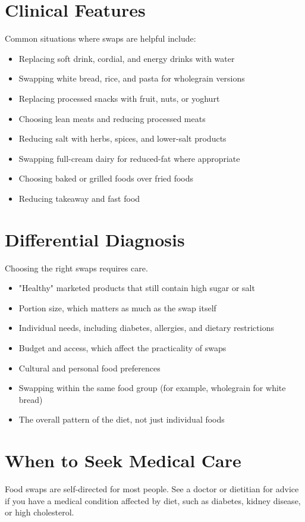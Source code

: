 \section*{Clinical Features}
Common situations where swaps are helpful include:

\begin{itemize}
    \item Replacing soft drink, cordial, and energy drinks with water
    \item Swapping white bread, rice, and pasta for wholegrain versions
    \item Replacing processed snacks with fruit, nuts, or yoghurt
    \item Choosing lean meats and reducing processed meats
    \item Reducing salt with herbs, spices, and lower-salt products
    \item Swapping full-cream dairy for reduced-fat where appropriate
    \item Choosing baked or grilled foods over fried foods
    \item Reducing takeaway and fast food
\end{itemize}

\section*{Differential Diagnosis}
Choosing the right swaps requires care.

\begin{itemize}
    \item "Healthy" marketed products that still contain high sugar or salt
    \item Portion size, which matters as much as the swap itself
    \item Individual needs, including diabetes, allergies, and dietary restrictions
    \item Budget and access, which affect the practicality of swaps
    \item Cultural and personal food preferences
    \item Swapping within the same food group (for example, wholegrain for white bread)
    \item The overall pattern of the diet, not just individual foods
\end{itemize}

\section*{When to Seek Medical Care}
Food swaps are self-directed for most people. See a doctor or dietitian for advice if you have a medical condition affected by diet, such as diabetes, kidney disease, or high cholesterol.

